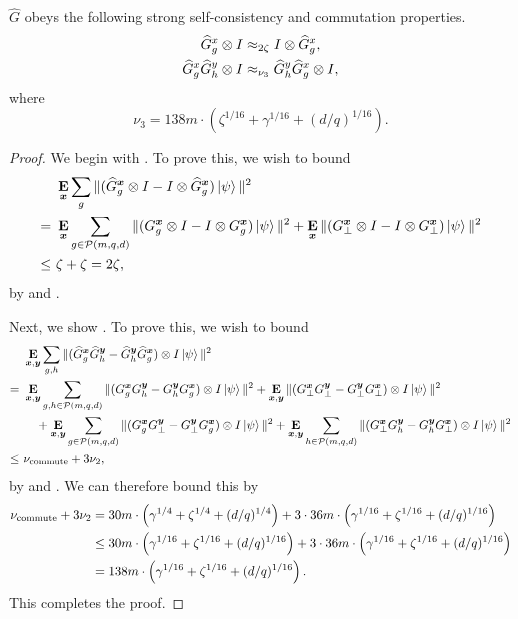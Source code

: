 \begin{corollary}\label{cor:G-hat-facts}
  $\widehat{G}$ obeys the
  following strong self-consistency and commutation properties.
  \begin{align}
    \widehat{G}^{x}_{g} \otimes I &\approx_{2\zeta} I \otimes \widehat{G}^{x}_{g}, \label{eq:gselfconall}\\
    \widehat{G}^{x}_{g}\widehat{G}^{y}_{h} \otimes I &\approx_{\nu_3} \widehat{G}^{y}_{h}
                               \widehat{G}^{x}_{g} \otimes I, \label{eq:gcomall}
  \end{align}
  where
  \[ \nu_{3} = 138 m \cdot \left(\zeta^{1/16} + \gamma^{1/16} + (d/q)^{1/16}\right). \]
\end{corollary}
\begin{proof}
We begin with . To prove this, we wish to bound
\begin{align*}
&\mathop{\bf E\/}_{{\boldsymbol{x}}} \sum_{g} \Vert(\widehat{G}^{{\boldsymbol{x}}}_g \otimes I - I \otimes \widehat{G}^{{\boldsymbol{x}}}_g) \ket{\psi} \Vert^2\\
=~&\mathop{\bf E\/}_{{\boldsymbol{x}}} \sum_{g \in \mathcal{P}(m, q, d)} \Vert(G^{{\boldsymbol{x}}}_g \otimes I - I \otimes G^{{\boldsymbol{x}}}_g) \ket{\psi} \Vert^2
	+ \mathop{\bf E\/}_{{\boldsymbol{x}}} \Vert(G^{{\boldsymbol{x}}}_{\bot} \otimes I - I \otimes G^{{\boldsymbol{x}}}_{\bot}) \ket{\psi} \Vert^2\\
\leq~& \zeta + \zeta = 2\zeta,
\end{align*}
by  and .

Next, we show .
To prove this, we wish to bound
\begin{align*}
&\mathop{\bf E\/}_{{\boldsymbol{x}}, \boldsymbol{y}} \sum_{g, h} \Vert(\widehat{G}^{{\boldsymbol{x}}}_g \widehat{G}^{\boldsymbol{y}}_h - \widehat{G}^{\boldsymbol{y}}_h \widehat{G}^{{\boldsymbol{x}}}_g) \otimes I \ket{\psi}\Vert^2\\
=~&\mathop{\bf E\/}_{{\boldsymbol{x}}, \boldsymbol{y}} \sum_{g, h \in \mathcal{P}(m, q, d)} \Vert(G^{{\boldsymbol{x}}}_g G^{\boldsymbol{y}}_h - G^{\boldsymbol{y}}_h G^{{\boldsymbol{x}}}_g) \otimes I \ket{\psi}\Vert^2
	+ \mathop{\bf E\/}_{{\boldsymbol{x}}, \boldsymbol{y}} \Vert(G^{{\boldsymbol{x}}}_{\bot} G^{\boldsymbol{y}}_{\bot} - G^{\boldsymbol{y}}_{\bot} G^{{\boldsymbol{x}}}_{\bot}) \otimes I \ket{\psi}\Vert^2\\
& \quad + \mathop{\bf E\/}_{{\boldsymbol{x}}, \boldsymbol{y}} \sum_{g\in \mathcal{P}(m, q, d)} \Vert(G^{{\boldsymbol{x}}}_g G^{\boldsymbol{y}}_{\bot} - G^{\boldsymbol{y}}_{\bot} G^{{\boldsymbol{x}}}_g) \otimes I \ket{\psi}\Vert^2
	+ \mathop{\bf E\/}_{{\boldsymbol{x}}, \boldsymbol{y}} \sum_{h\in \mathcal{P}(m, q, d)} \Vert(G^{{\boldsymbol{x}}}_{\bot} G^{\boldsymbol{y}}_h - G^{\boldsymbol{y}}_h G^{{\boldsymbol{x}}}_{\bot}) \otimes I \ket{\psi}\Vert^2\\
\leq~& \nu_{\mathrm{commute}} + 3\nu_2,
\end{align*}
by  and .
We can therefore bound this by
\begin{align*}
\nu_{\mathrm{commute}} + 3\nu_2
&= 30 m \cdot \left(\gamma^{1/4} +\zeta^{1/4} +  (d/q)^{1/4}\right)
	+ 3 \cdot 36 m \cdot \left(\gamma^{1/16} + \zeta^{1/16} +  (d/q)^{1/16}\right)\\
&\leq 30 m \cdot \left(\gamma^{1/16} + \zeta^{1/16} + (d/q)^{1/16}\right)
	+ 3 \cdot 36 m \cdot \left(\gamma^{1/16} + \zeta^{1/16} +  (d/q)^{1/16}\right)\\
&= 138 m \cdot \left( \gamma^{1/16} + \zeta^{1/16} +(d/q)^{1/16}\right).	
\end{align*}
This completes the proof.
\end{proof}


